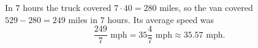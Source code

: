 In $7$ hours the truck covered $7\cdot40=280$ miles, so the van covered $529-280=249$ miles in $7$ hours. Its average speed was
\[
\dfrac{249}{7}\text{ mph}=\boxed{35\dfrac{4}{7}\text{ mph}}\approx35.57\text{ mph}.
\]
